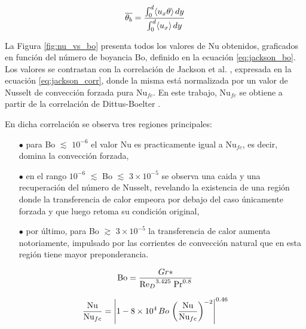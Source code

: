 \begin{equation*}
\overline{\theta_b} = \frac{\int^d_0 \langle u_x \theta \rangle \hspace*{0.5mm} dy }{\int^d_0 \langle u_x \rangle \hspace*{0.5mm} dy}
\end{equation*}

La Figura \ref{fig:nu_vs_bo} presenta todos los valores de Nu obtenidos, graficados en función del número de boyancia Bo, definido en la ecuación \ref{eq:jackson_bo}. Los valores se contrastan con la correlación de Jackson et al. \cite{jackson1989studies}, expresada en la ecuación \ref{eq:jackson_corr}, donde la misma está normalizada por un valor de Nusselt de convección forzada pura Nu$_{fc}$. En este trabajo, Nu$_{fc}$ se obtiene a partir de la correlación de Dittus-Boelter \cite{incropera}. 

En dicha correlación se observa tres regiones principales:
\begin{itemize}
 \item[$\bullet$] para Bo $\lesssim$ $10^{-6}$ el valor Nu es practicamente igual a Nu$_{fc}$, es decir, domina la convección forzada,
 \item[$\bullet$] en el rango $10^{-6}$ $\lesssim$ Bo $\lesssim$ $3 \times 10^{-5}$ se observa una caida y una recuperación del número de Nusselt, revelando la existencia de una región donde la transferencia de calor empeora por debajo del caso únicamente forzada y que luego retoma su condición original,
 \item[$\bullet$] por último, para Bo $\gtrsim$ $3 \times 10^{-5}$ la transferencia de calor aumenta notoriamente, impulsado por las corrientes de convección natural que en esta región tiene mayor preponderancia.
\end{itemize}


\begin{equation}
\text{Bo}= \frac{Gr*}{{\text{Re}_D}^{3.425} \hspace*{1mm} \text{Pr}^{0.8} }
\label{eq:jackson_bo}
\end{equation}

\begin{equation}
\frac{\text{Nu}}{\text{Nu}_{fc}}= \left\vert  1 - 8 \times 10^4 \hspace*{0.5mm} Bo \hspace*{0.5mm} \left( \frac{\text{Nu}}{\text{Nu}_{fc}} \right)^{-2}  \right\vert^{0.46}
\label{eq:jackson_corr} 
\end{equation}


